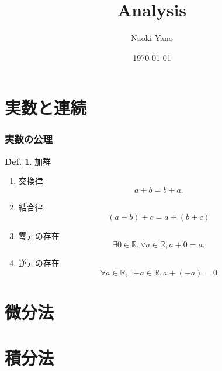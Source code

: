 \documentclass[a4paper,10pt,report]{amsart}
\title{Analysis}
\author{Naoki Yano}
\date{\today}
\theoremstyle{plain}
\theoremstyle{definition}
\newtheorem{defn}{Def.}[section]
\theoremstyle{remark}
\begin{document}
    \maketitle
    \tableofcontents
    \part{実数と連続}
    \section{実数の公理}
    \begin{leftbar}
        \begin{defn}加群\par
            \begin{enumerate}
                \item 交換律
                \begin{equation*}
                    a+b=b+a.
                \end{equation*}
                \item 結合律
                \begin{equation}
                    (a+b)+c=a+(b+c)
                \end{equation}
                \item 零元の存在
                \begin{equation}
                    \exists0\in\mathbb{R},\forall a\in\mathbb{R},a+0=a.
                \end{equation}
                \item 逆元の存在
                \begin{equation}
                    \forall a\in\mathbb{R},\exists -a\in\mathbb{R},a+(-a)=0
                \end{equation}
            \end{enumerate}
        \end{defn}
    \end{leftbar}
    \part{微分法}
    \part{積分法}
\end{document}
